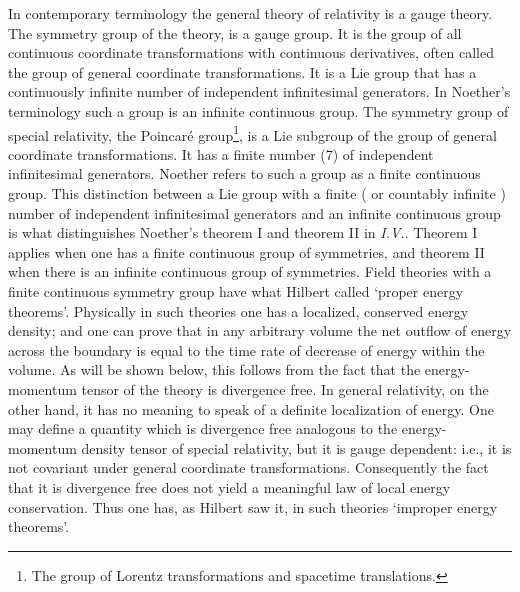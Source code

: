 \documentclass[12pt]{article}
\begin{document}
In contemporary terminology the general theory of relativity is a gauge theory.
The symmetry group of the theory, is a gauge group. It is the group of all continuous coordinate 
transformations with continuous derivatives,   often called
the group of general coordinate transformations. 
   It is a Lie group that has a continuously infinite number of independent infinitesimal generators. In Noether's terminology  such a group is an infinite continuous group.
The symmetry group of special relativity,  the Poincar\'{e} group\footnote{
The group of Lorentz transformations and spacetime translations.}, 
 is a Lie subgroup of the group of general coordinate transformations.  It
 has a finite number (7) of independent infinitesimal
generators. Noether refers to such a  group as a finite continuous group.
This distinction between a Lie group with a finite ( or countably infinite ) number of independent infinitesimal generators and an infinite continuous
group is what distinguishes Noether's theorem I and theorem II  in {\it{I.V.}}.
Theorem I applies when one has a finite continuous  group of symmetries,
and theorem II  when there is an infinite continuous group of
symmetries. Field theories with a finite continuous symmetry group have what
Hilbert called `proper energy theorems'. Physically in such
theories one has a localized, conserved energy density; and 
one can prove that in any arbitrary volume the net outflow of energy 
across the boundary is
equal to the time rate of decrease of energy within the volume. As will
be shown below, this follows from the fact that the energy-momentum tensor
of the theory is divergence free. In general relativity,
on the other hand, it has no meaning to speak of a definite localization of
energy.   One may define a quantity which is divergence free analogous
to the energy-momentum density tensor of special relativity, 
but it  is gauge dependent: i.e., it is not covariant under general coordinate transformations. 
Consequently the fact that it
is divergence free does not yield a meaningful law of local energy conservation.
Thus one has, as Hilbert saw it, in such theories `improper
energy theorems'.
\end{document}
